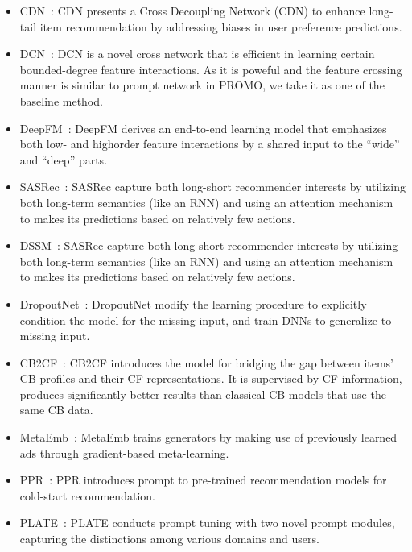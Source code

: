 \documentclass[sigconf]{acmart}
\newcommand{\sys}{\textsc{PROMO}\xspace}
\begin{document}
\label{baseline_methods}
\begin{itemize}[leftmargin=*]
    \item CDN~\cite{zhang2023empowering}: CDN presents a Cross Decoupling Network (CDN) to enhance long-tail item recommendation by addressing biases in user preference predictions.
    \item DCN~\cite{wang2017deep}: DCN is a novel cross network that is efficient in learning certain bounded-degree feature interactions. As it is poweful and the feature crossing manner is similar to prompt network in \sys, we take it as one of the baseline method. 
    \item DeepFM~\cite{guo2017deepfm}: DeepFM derives an end-to-end learning model that emphasizes both low- and highorder feature interactions by a shared input to the “wide” and “deep” parts.
    \item SASRec~\cite{kang2018self}: SASRec capture both long-short recommender interests by utilizing both long-term semantics (like an RNN) and using an attention mechanism to makes its predictions based on relatively few actions. 
    \item DSSM~\cite{huang2013learning}: SASRec capture both long-short recommender interests by utilizing both long-term semantics (like an RNN) and using an attention mechanism to makes its predictions based on relatively few actions. 
    \item DropoutNet~\cite{volkovs2017dropoutnet}: DropoutNet modify the learning procedure to explicitly condition the model for the missing input, and train DNNs to generalize to missing input.
    \item CB2CF~\cite{barkan2019cb2cf}: CB2CF introduces the model for bridging the gap between items’ CB profiles and their CF representations. It is supervised by CF information, produces significantly better results than classical CB models that use the same CB data.
    \item MetaEmb~\cite{pan2019warm}: MetaEmb trains generators by making use of previously learned ads through gradient-based meta-learning.
    \item PPR~\cite{wu2024personalized}: PPR introduces prompt to pre-trained recommendation models for cold-start recommendation.
    \item PLATE~\cite{wang2023plate}: PLATE conducts prompt tuning with two novel prompt modules, capturing the distinctions among various domains and users. 
\end{itemize}
\end{document}
